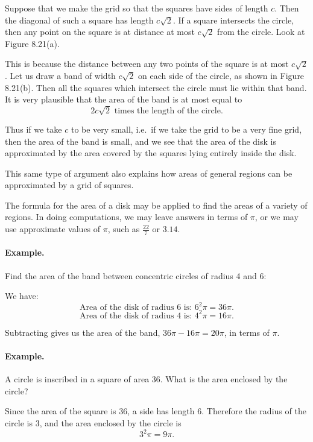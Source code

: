 \documentclass[12pt]{book} %
\begin{document}
Suppose that we make the grid so that the squares have sides of length $c$. Then the diagonal of such a square has length $c\sqrt{2}$. If a square intersects the circle, then any point on the square is at distance at most $c\sqrt{2}$ from the circle. Look at Figure 8.21(a).


This is because the distance between any two points of the square is at most $c\sqrt{2}$. Let us draw a band of width $c\sqrt{2}$ on each side of the circle, as shown in Figure 8.21(b). Then all the squares which intersect the circle must lie within that band. It is very plausible that the area of the band is at most equal to
\[
2c\sqrt{2}\text{ times the length of the circle.}
\]

Thus if we take $c$ to be very small, i.e.\ if we take the grid to be a very fine grid, then the area of the band is small, and we see that the area of the disk is approximated by the area covered by the squares lying entirely inside the disk.

This same type of argument also explains how areas of general regions can be approximated by a grid of squares.

The formula for the area of a disk may be applied to find the areas of a variety of regions. In doing computations, we may leave answers in terms of $\pi$, or we may use approximate values of $\pi$, such as $\frac{22}{7}$ or $3.14$.

\paragraph{Example.}
Find the area of the band between concentric circles of radius 4 and 6:


We have:
\[
\text{Area of the disk of radius 6 is: }6^2\pi=36\pi.
\]
\[
\text{Area of the disk of radius 4 is: }4^2\pi=16\pi.
\]

Subtracting gives us the area of the band, $36\pi-16\pi=20\pi$, in terms of $\pi$.

\paragraph{Example.}
A circle is inscribed in a square of area 36. What is the area enclosed by the circle?


Since the area of the square is 36, a side has length 6. Therefore the radius of the circle is 3, and the area enclosed by the circle is
\[
3^2\pi=9\pi.
\]
\end{document}
